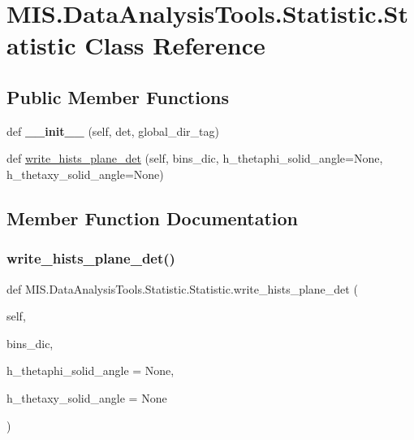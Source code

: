 \hypertarget{classMIS_1_1DataAnalysisTools_1_1Statistic_1_1Statistic}{}\section{M\+I\+S.\+Data\+Analysis\+Tools.\+Statistic.\+Statistic Class Reference}
\label{classMIS_1_1DataAnalysisTools_1_1Statistic_1_1Statistic}
\subsection*{Public Member Functions}
\begin{DoxyCompactItemize}
\item 
\mbox{\label{classMIS_1_1DataAnalysisTools_1_1Statistic_1_1Statistic_ad02b92bfa469757bd39f40abac1567ed}} 
def {\bfseries \+\_\+\+\_\+init\+\_\+\+\_\+} (self, det, global\+\_\+dir\+\_\+tag)
\item 
def \hyperlink{classMIS_1_1DataAnalysisTools_1_1Statistic_1_1Statistic_a28f6e2fee2874077a3971ab083db3cf2}{write\+\_\+hists\+\_\+plane\+\_\+det} (self, bins\+\_\+dic, h\+\_\+thetaphi\+\_\+solid\+\_\+angle=None, h\+\_\+thetaxy\+\_\+solid\+\_\+angle=None)
\end{DoxyCompactItemize}


\subsection{Member Function Documentation}
\mbox{\label{classMIS_1_1DataAnalysisTools_1_1Statistic_1_1Statistic_a28f6e2fee2874077a3971ab083db3cf2}} 
\subsubsection{\texorpdfstring{write\+\_\+hists\+\_\+plane\+\_\+det()}{write\_hists\_plane\_det()}}
{\footnotesize\ttfamily def M\+I\+S.\+Data\+Analysis\+Tools.\+Statistic.\+Statistic.\+write\+\_\+hists\+\_\+plane\+\_\+det (\begin{DoxyParamCaption}\item[{}]{self,  }\item[{}]{bins\+\_\+dic,  }\item[{}]{h\+\_\+thetaphi\+\_\+solid\+\_\+angle = {\ttfamily None},  }\item[{}]{h\+\_\+thetaxy\+\_\+solid\+\_\+angle = {\ttfamily None} }\end{DoxyParamCaption})}

